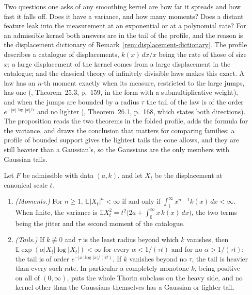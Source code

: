 Two questions one asks of any smoothing kernel are how far it spreads and how fast it falls
off. Does it have a variance, and how many moments? Does a distant feature leak into the
measurement at an exponential or at a polynomial rate? For an admissible kernel both answers
are in the tail of the profile, and the reason is the displacement dictionary of
Remark~\ref{rem:displacement-dictionary}. The profile describes a catalogue of displacements,
$k(x)\,dx/x$ being the rate of those of size $x$; a large displacement of the kernel comes
from a large displacement in the catalogue; and the classical theory of infinitely divisible
laws makes this exact. A law has an $n$-th moment exactly when its \Levy{} measure, restricted
to the large jumps, has one (, Theorem~25.3, p.~159, in the form with a
submultiplicative weight), and when the jumps are bounded by a radius $\tau$ the tail of the
law is of the order $e^{-|x|\log|x|/\tau}$ and no lighter (,
Theorem~26.1, p.~168, which states both directions). The proposition reads the two theorems
in the folded profile, adds the formula for the variance, and draws the conclusion that
matters for comparing families: a profile of bounded support gives the lightest tails the
cone allows, and they are still heavier than a Gaussian's, so the Gaussians are the only
members with Gaussian tails.

\begin{proposition}\label{prop:moments-tails}
Let $F$ be admissible with data $(a,k)$, and let $X_t$ be the displacement at canonical scale
$t$.
\begin{enumerate}
\item \emph{(Moments.)} For $n \ge 1$, $\mathbb{E}|X_t|^n < \infty$ if and only if
$\int_1^\infty x^{n-1}k(x)\,dx < \infty$. When finite, the variance is
$\mathbb{E}X_t^2 = t^2\bigl(2a + \int_0^\infty x\,k(x)\,dx\bigr)$, the two terms being the
jitter and the second moment of the catalogue.
\item \emph{(Tails.)} If $k \not\equiv 0$ and $\tau$ is the least radius beyond which $k$
vanishes, then $\mathbb{E}\exp(\alpha|X_t|\log|X_t|) < \infty$ for every $\alpha < 1/(\tau t)$
and for no $\alpha > 1/(\tau t)$: the tail is of order $e^{-|x|\log|x|/(\tau t)}$. If $k$
vanishes beyond no $\tau$, the tail is heavier than every such rate. In particular a completely monotone $k$,
being positive on all of $(0,\infty)$, puts the whole Thorin subclass on the heavy side, and no
kernel other than the Gaussians themselves has a Gaussian or lighter tail.
\end{enumerate}
\end{proposition}

